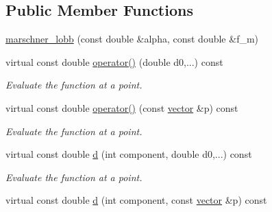 \subsection*{Public Member Functions}
\begin{DoxyCompactItemize}
\item 
\hyperlink{classsisl_1_1test_1_1marschner__lobb_a48a8f4116a2e924820417b0191864e20}{marschner\+\_\+lobb} (const double \&alpha, const double \&f\+\_\+m)
\item 
\mbox{\label{classsisl_1_1test_1_1marschner__lobb_ae605ec65e01a2692f365d73bb7135762}} 
virtual const double \hyperlink{classsisl_1_1test_1_1marschner__lobb_ae605ec65e01a2692f365d73bb7135762}{operator()} (double d0,...) const
\begin{DoxyCompactList}\small\item\em Evaluate the function at a point. \end{DoxyCompactList}\item 
\mbox{\label{classsisl_1_1test_1_1marschner__lobb_a04d85ffd109440215b2f77b70e24d5d5}} 
virtual const double \hyperlink{classsisl_1_1test_1_1marschner__lobb_a04d85ffd109440215b2f77b70e24d5d5}{operator()} (const \hyperlink{namespacesisl_a2069bd5374a9be042ff3ce3306d41e1a}{vector} \&p) const
\begin{DoxyCompactList}\small\item\em Evaluate the function at a point. \end{DoxyCompactList}\item 
\mbox{\label{classsisl_1_1test_1_1marschner__lobb_aa84fac794caf4cc188ac547e274648d3}} 
virtual const double \hyperlink{classsisl_1_1test_1_1marschner__lobb_aa84fac794caf4cc188ac547e274648d3}{d} (int component, double d0,...) const
\begin{DoxyCompactList}\small\item\em Evaluate the function at a point. \end{DoxyCompactList}\item 
\mbox{\label{classsisl_1_1test_1_1marschner__lobb_a8b2a2e637443cb4998f71d8721f9b4e2}} 
virtual const double \hyperlink{classsisl_1_1test_1_1marschner__lobb_a8b2a2e637443cb4998f71d8721f9b4e2}{d} (int component, const \hyperlink{namespacesisl_a2069bd5374a9be042ff3ce3306d41e1a}{vector} \&p) const

\end{DoxyCompactItemize}
